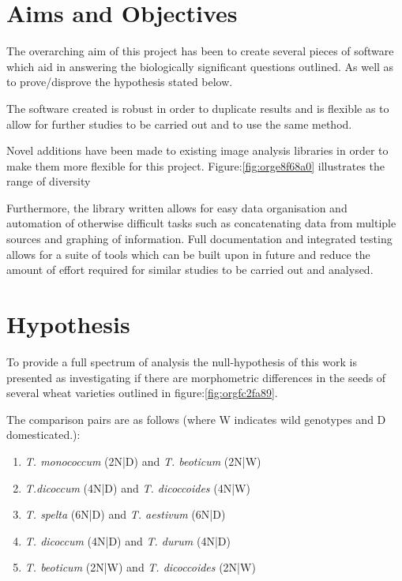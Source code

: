 \documentclass[11pt]{report}
\begin{document}
\section{Aims and Objectives}
\label{sec:org703482f}

The overarching aim of this project has been to create several pieces of software which aid in answering the biologically significant questions outlined. As well as to prove/disprove the hypothesis stated below.

The software created is robust in order to duplicate results and is flexible as to allow for further studies to be carried out and to use the same method.

Novel additions have been made to existing image analysis libraries in order to make them more flexible for this project. Figure:\ref{fig:orge8f68a0} illustrates the range of diversity

Furthermore, the library written allows for easy data organisation and automation of otherwise difficult tasks such as concatenating data from multiple sources and graphing of information. Full documentation and integrated testing allows for a suite of tools which can be built upon in future and reduce the amount of effort required for similar studies to be carried out and analysed.

\section{Hypothesis}
\label{sec:orgbbe99cc}
To provide a full spectrum of analysis the null-hypothesis of this work is presented as investigating if there are morphometric differences in the seeds of several wheat varieties outlined in figure:\ref{fig:orgfc2fa89}.

The comparison pairs are as follows (where W indicates wild genotypes and D domesticated.):

\begin{enumerate}
\item \emph{T. monococcum} (2N|D) and \emph{T. beoticum} (2N|W)
\item \emph{T.dicoccum} (4N|D) and \emph{T. dicoccoides} (4N|W)
\item \emph{T. spelta} (6N|D) and \emph{T. aestivum} (6N|D)
\item \emph{T. dicoccum} (4N|D) and \emph{T. durum} (4N|D)
\item \emph{T. beoticum} (2N|W) and \emph{T. dicoccoides} (2N|W)
\end{enumerate}
\end{document}
